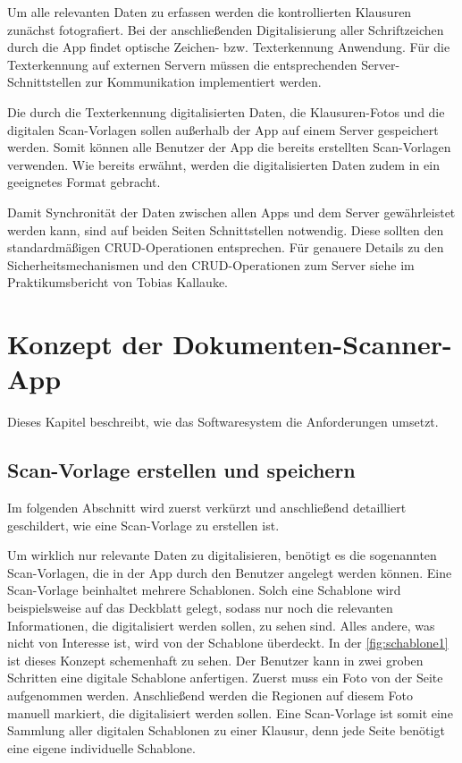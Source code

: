 \documentclass[notables, nomenclature, oneside, 150]{HSMW-Thesis}
\begin{document}
	Um alle relevanten Daten zu erfassen werden die kontrollierten Klausuren zunächst fotografiert. Bei der anschließenden Digitalisierung aller Schriftzeichen durch die App findet optische Zeichen- bzw. Texterkennung Anwendung. Für die Texterkennung auf externen Servern müssen die entsprechenden Server-Schnittstellen zur Kommunikation implementiert werden. 
	 
	Die durch die Texterkennung digitalisierten Daten, die Klausuren-Fotos und die digitalen Scan-Vorlagen sollen außerhalb der App auf einem Server gespeichert werden. Somit können alle Benutzer der App die bereits erstellten Scan-Vorlagen verwenden. Wie bereits erwähnt, werden die digitalisierten Daten zudem in ein geeignetes Format gebracht.
	
	Damit Synchronität der Daten zwischen allen Apps und dem Server gewährleistet werden kann, sind auf beiden Seiten Schnittstellen notwendig. Diese sollten den standardmäßigen CRUD-Operationen entsprechen. Für genauere Details zu den Sicherheitsmechanismen und den CRUD-Operationen zum Server siehe im Praktikumsbericht von Tobias Kallauke. 


\chapter{Konzept der Dokumenten-Scanner-App}\label{ch:konzept}
	Dieses Kapitel beschreibt, wie das Softwaresystem die Anforderungen umsetzt.
	
	\section{Scan-Vorlage erstellen und speichern}
	
		Im folgenden Abschnitt wird zuerst verkürzt und anschließend detailliert geschildert, wie eine Scan-Vorlage zu erstellen ist.
    
		Um wirklich nur relevante Daten zu digitalisieren, benötigt es die sogenannten Scan-Vorlagen, die in der App durch den Benutzer angelegt werden können. Eine Scan-Vorlage beinhaltet mehrere Schablonen. Solch eine Schablone wird beispielsweise auf das Deckblatt gelegt, sodass nur noch die relevanten Informationen, die digitalisiert werden sollen, zu sehen sind. Alles andere, was nicht von Interesse ist, wird von der Schablone überdeckt. In der \autoref{fig:schablone1} ist dieses Konzept schemenhaft zu sehen. Der Benutzer kann in zwei groben Schritten eine digitale Schablone anfertigen. Zuerst muss ein Foto von der Seite aufgenommen werden. Anschließend werden die Regionen auf diesem Foto manuell markiert, die digitalisiert werden sollen. Eine Scan-Vorlage ist somit eine Sammlung aller digitalen Schablonen zu einer Klausur, denn jede Seite benötigt eine eigene individuelle Schablone.
				
\end{document}
